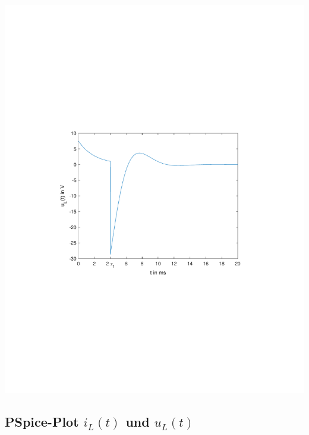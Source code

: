\documentclass[11pt]{scrartcl}
\begin{document}
\begin{center}

  \includegraphics[width=0.70\linewidth]{./Assets/ML_Spannung_Plot.pdf}
  \label{fig:ML_Spannung_Plot}
\end{center}

\subsection{PSpice-Plot $i_L(t)$ und $u_L(t)$} %

\end{document}
